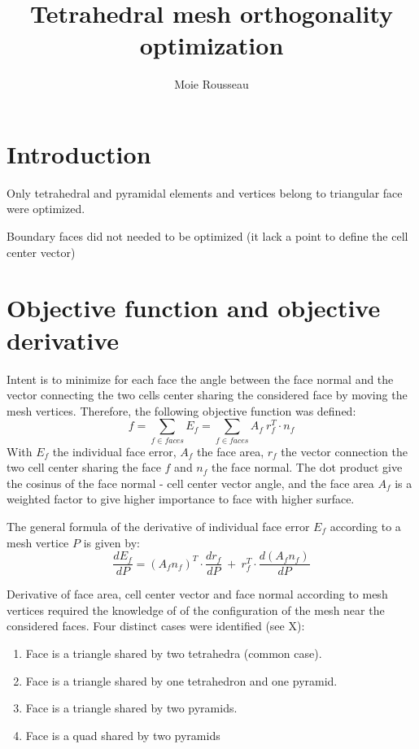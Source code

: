 \documentclass[11pt]{article}
\title{\textbf{Tetrahedral mesh orthogonality optimization}}
\author{Moie Rousseau}
\date{}
\begin{document}
\maketitle
\thispagestyle{empty}

\section{Introduction}

Only tetrahedral and pyramidal elements and vertices belong to triangular face were optimized.

Boundary faces did not needed to be optimized (it lack a point to define the cell center vector)

\section{Objective function and objective derivative}

Intent is to minimize for each face the angle between the face normal and the vector connecting the two cells center sharing the considered face by moving the mesh vertices. Therefore, the following objective function was defined:
\begin{equation}
f = \sum_{f \in faces} E_f = \sum_{f \in faces} A_f\ r_f^T \cdot n_f
\end{equation}
With $E_f$ the individual face error, $A_f$ the face area, $r_f$ the vector connection the two cell center sharing the face $f$ and $n_f$ the face normal. The dot product give the cosinus of the face normal - cell center vector angle, and the face area $A_f$ is a weighted factor to give higher importance to face with higher surface.

The general formula of the derivative of individual face error $E_f$ according to a mesh vertice $P$ is given by:
\begin{equation}
\frac{dE_f}{dP} = (A_f n_f)^T \cdot \frac{d r_f}{dP}\ +\ r_f^T \cdot \frac{d(A_f n_f)}{dP}
\end{equation}

Derivative of face area, cell center vector and face normal according to mesh vertices required the knowledge of of the configuration of the mesh near the considered faces. Four distinct cases were identified (see X):
\begin{enumerate}
  \item Face is a triangle shared by two tetrahedra (common case). 
  \item Face is a triangle shared by one tetrahedron and one pyramid.
  \item Face is a triangle shared by two pyramids.
  \item Face is a quad shared by two pyramids
\end{enumerate}
\end{document}
